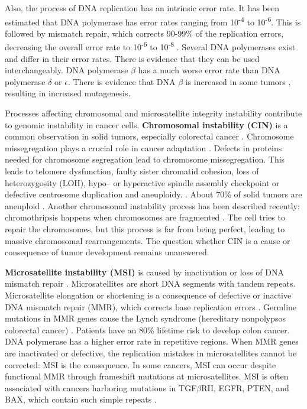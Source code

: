     Also, the process of DNA replication has an intrinsic error rate. It has
    been estimated that DNA polymerase has error rates ranging from
    10\textsuperscript{-4} to 10\textsuperscript{-6}. This is followed by
    mismatch repair, which corrects 90-99\% of the replication errors,
    decreasing the overall error rate to 10\textsuperscript{-6} to
    10\textsuperscript{-8} {\cite{multiple_mutations}}. Several DNA polymerases
    exist and differ in their error rates. There is evidence that they can be
    used interchangeably. DNA polymerase $\beta$ has a much worse error rate
    than DNA polymerase $\delta$ or $\epsilon$. There is evidence that DNA
    $\beta$ is increased in some tumors {\cite{dna_pol}}, resulting in increased
    mutagenesis.

    Processes affecting chromosomal and microsatellite integrity instability
    contribute to genomic instability in cancer cells. \textbf{Chromosomal
    instability (CIN)} is a common observation in solid tumors, especially
    colorectal cancer {\cite{cin_crc}}. Chromosome missegregation plays a
    crucial role in cancer adaptation {\cite{chromosome_missegregation}}.
    Defects in proteins needed for chromosome segregation lead to chromosome
    missegregation. This leads to telomere dysfunction, faulty sister chromatid
    cohesion, loss of heterozygosity (LOH), hypo-- or hyperactive spindle
    assembly checkpoint or defective centrosome duplication and aneuploidy.
    {\cite{cin_crc}}. About 70\% of solid tumors are aneuploid
    {\cite{aneuploidy}}. Another chromosomal instability process has been
    described recently: chromothripsis happens when chromosomes are fragmented
    {\cite{chromothripsis_1}} {\cite{chromothripsis_2}}
    {\cite{chromothripsis_2}}. The cell tries to repair the chromosomes, but
    this process is far from being perfect, leading to massive chromosomal
    rearrangements. The question whether CIN is a cause or consequence of tumor
    development remains unanswered.

    \textbf{Microsatellite instability (MSI)} is caused by inactivation or loss
    of DNA mismatch repair {\cite{msi}}. Microsatellites are short DNA segments
    with tandem repeats. Microsatellite elongation or shortening is a
    consequence of defective or inactive DNA mismatch repair (MMR), which
    corrects base replication errors {\cite{cin_crc}}. Germline mutations in MMR
    genes cause the Lynch syndrome (hereditary nonpolypsos colorectal cancer)
    {\cite{lynch}}. Patients have an 80\% lifetime risk to develop colon cancer.
    DNA polymerase has a higher error rate in repetitive regions. When MMR genes
    are inactivated or defective, the replication mistakes in microsatellites
    cannot be corrected: MSI is the consequence. In some cancers, MSI can occur
    despite functional MMR through frameshift mutations at microsatellites. MSI
    is often associated with cancers harboring mutations in TGF$\beta$RII, EGFR,
    PTEN, and BAX, which contain such simple repeats {\cite{micro}}.

